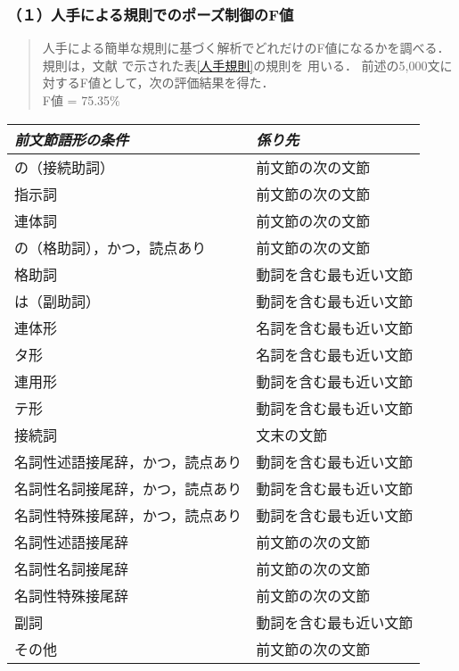 \subsubsection{（１）人手による規則でのポーズ制御のF値}
\begin{quote}
     人手による簡単な規則に基づく解析でどれだけのF値になるかを調べる．
     規則は，文献\cite{内元1999} で示された表\ref{人手規則}の規則を
     用いる．
     前述の5,000文に対するF値として，次の評価結果を得た．\\
     F値    = 75.35\%
\end{quote}
\begin{table*}
\caption{人手規則}
\label{人手規則}
\begin{center}
\begin{tabular}{ll} \hline
	{\it 前文節語形の条件} &	{\it 係り先} \\ \hline
     の（接続助詞）                  &   前文節の次の文節\\
     指示詞                          &   前文節の次の文節\\
     連体詞                          &   前文節の次の文節\\
     の（格助詞），かつ，読点あり    &   前文節の次の文節\\
     格助詞                          &   動詞を含む最も近い文節\\
     は（副助詞）                    &   動詞を含む最も近い文節\\
     連体形                          &   名詞を含む最も近い文節\\
     タ形                            &   名詞を含む最も近い文節\\
     連用形                          &   動詞を含む最も近い文節\\
     テ形                            &   動詞を含む最も近い文節\\
     接続詞                          &   文末の文節\\
     名詞性述語接尾辞，かつ，読点あり&   動詞を含む最も近い文節\\
     名詞性名詞接尾辞，かつ，読点あり&   動詞を含む最も近い文節\\
     名詞性特殊接尾辞，かつ，読点あり&   動詞を含む最も近い文節\\
     名詞性述語接尾辞                &   前文節の次の文節\\
     名詞性名詞接尾辞                &   前文節の次の文節\\
     名詞性特殊接尾辞                &   前文節の次の文節\\
     副詞                            &   動詞を含む最も近い文節\\
     その他                          &   前文節の次の文節\\ \hline
\end{tabular}
\end{center}
\end{table*}


